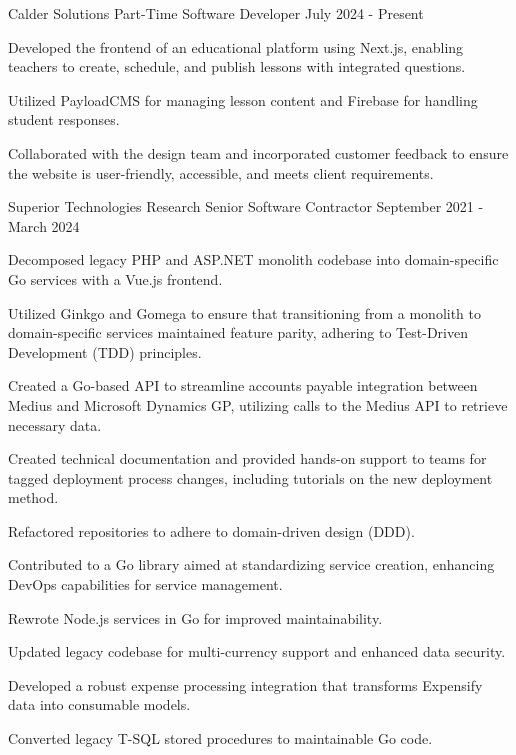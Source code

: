 \documentclass{../styles/resume}
\begin{document}
\subsectionpositiondate
    {Calder Solutions}
    {Part-Time Software Developer}
    {July 2024 - Present}
\resumesublistbegin
    \item Developed the frontend of an educational platform using Next.js, enabling teachers to create, schedule, and publish lessons with integrated questions.
    \item Utilized PayloadCMS for managing lesson content and Firebase for handling student responses.
    \item Collaborated with the design team and incorporated customer feedback to ensure the website is user-friendly, accessible, and meets client requirements.
\resumesublistend

\subsectionpositiondate
    {Superior Technologies Research}
    {Senior Software Contractor}
    {September 2021 - March 2024}
\resumesublistbegin
    \item Decomposed legacy PHP and ASP.NET monolith codebase into domain-specific Go services with a Vue.js frontend.
    \item Utilized Ginkgo and Gomega to ensure that transitioning from a monolith to domain-specific services maintained feature parity, adhering to Test-Driven Development (TDD) principles.
    \item Created a Go-based API to streamline accounts payable integration between Medius and Microsoft Dynamics GP, utilizing calls to the Medius API to retrieve necessary data.
    \item Created technical documentation and provided hands-on support to teams for tagged deployment process changes, including tutorials on the new deployment method.
    \item Refactored repositories to adhere to domain-driven design (DDD).
    \item Contributed to a Go library aimed at standardizing service creation, enhancing DevOps capabilities for service management.
    \item Rewrote Node.js services in Go for improved maintainability.
    \item Updated legacy codebase for multi-currency support and enhanced data security.
    \item Developed a robust expense processing integration that transforms Expensify data into consumable models.
    \item Converted legacy T-SQL stored procedures to maintainable Go code.
\resumesublistend
\end{document}
